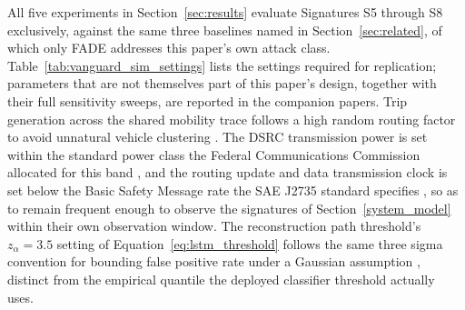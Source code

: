\documentclass[final,5p,twocolumn]{elsarticle}
\theoremstyle{remark}
\theoremstyle{plain}
\begin{document}
All five experiments in Section~\ref{sec:results} evaluate Signatures S5
through S8 exclusively, against the same three baselines named in
Section~\ref{sec:related}, of which only FADE addresses this paper's own
attack class. Table~\ref{tab:vanguard_sim_settings} lists the settings
required for replication; parameters that are not themselves part of this
paper's design, together with their full sensitivity sweeps, are reported
in the companion papers. Trip generation across the shared mobility trace
follows a high random routing factor to avoid unnatural vehicle
clustering \cite{sumo_randomtrips}. The DSRC transmission power is set
within the standard power class the Federal Communications Commission
allocated for this band \cite{FCC03-324}, and the routing update and data
transmission clock is set below the Basic Safety Message rate the SAE
J2735 standard specifies \cite{sae_j2735}, so as to remain frequent
enough to observe the signatures of Section~\ref{system_model} within
their own observation window. The reconstruction path threshold's
$z_\alpha{=}3.5$ setting of Equation~\eqref{eq:lstm_threshold} follows the
same three sigma convention for bounding false positive rate under a
Gaussian assumption \cite{pukelsheim1994three}, distinct from the
empirical quantile the deployed classifier threshold actually uses.
\end{document}

